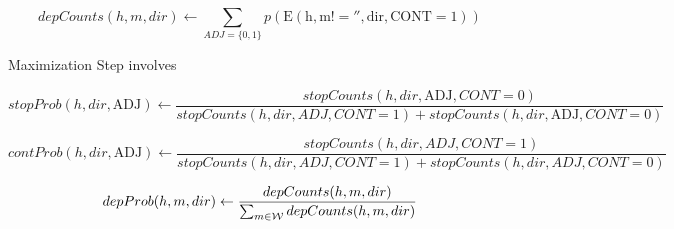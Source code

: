 \documentclass{article}
\begin{document}
\[depCounts(h, m, dir) \gets
 \sum\limits_{ADJ=\{0,1\}} p(\mathrm{E(h, m!='', dir, CONT = 1)}) \]

Maximization Step involves

  \[stopProb(h, dir, \mathrm{ADJ}) \gets 
  \frac{stopCounts(h, dir, \mathrm{ADJ}, CONT=0)}{
     stopCounts(h, dir, ADJ, CONT=1) + stopCounts(h, dir, \mathrm{ADJ}, CONT=0)} 
  \]

  \[contProb(h, dir, \mathrm{ADJ}) \gets 
  \frac{stopCounts(h, dir, ADJ, CONT=1)}{
     stopCounts(h, dir, ADJ, CONT=1) + stopCounts(h, dir, ADJ, CONT=0)} 
  \]

  \[depProb(h, m, dir) \gets 
  \frac{depCounts(h, m, dir)}{
    \sum_{m \in {\cal W}} depCounts(h, m, dir)}
  \]
\end{document}

